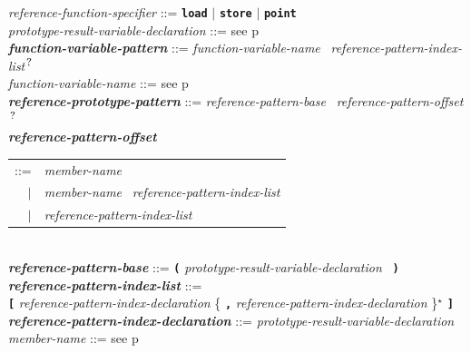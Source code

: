 \documentclass[12pt]{article}
\newcommand{\TT}[1]{{\tt \bfseries #1}}
\newcommand{\STAR}{{\Large $^\star$}}
\newcommand{\QMARK}{{$^{\,\mbox{\footnotesize ?}}$}}
\newcommand{\ttkey}[1]{{\tt \bfseries #1}}
\newcommand{\emkey}[1]{{\em \bfseries #1}}
\newcommand{\pagref}[1]{p\pageref{#1}}
\newenvironment{indpar}[1][0.3in]%
	{\begin{list}{}%
		     {\setlength{\itemsep}{0in}%
		      \setlength{\topsep}{0in}%
		      \setlength{\parsep}{1ex}%
		      \setlength{\labelwidth}{#1}%
		      \setlength{\leftmargin}{#1}%
		      \addtolength{\leftmargin}{\labelsep}}%
	 \item}%
	{\end{list}}
\begin{document}
\begin{indpar}[0.1in]
{\em reference-function-specifier} ::=
    \ttkey{load} $|$ \ttkey{store} $|$ \ttkey{point}
\\[0.5ex]
{\em prototype-result-variable-declaration} ::=
    see \pagref{PROTOTYPE-RESULT-VARIABLE-DECLARATION}
\\[0.5ex]
\emkey{function-variable-pattern}\label{FUNCTION-VARIABLE-PATTERN}
    ::= {\em function-variable-name}~ {\em reference-pattern-index-list}\QMARK{}
\\[0.5ex]
{\em function-variable-name} ::= see \pagref{FUNCTION-VARIABLE-NAME}
\\[0.5ex]
\emkey{reference-prototype-pattern}\label{REFERENCE-PROTOTYPE-PATTERN}
    ::= {\em reference-pattern-base}~ {\em reference-pattern-offset}\QMARK{}
\\[0.5ex]
\emkey{reference-pattern-offset}\label{REFERENCE-PATTERN-OFFSET}
    \begin{tabular}[t]{rl}
    ::= & {\em member-name} \\
    $|$ & {\em member-name}~ {\em reference-pattern-index-list} \\
    $|$ & {\em reference-pattern-index-list} \\
    \end{tabular}
\\[0.5ex]
\emkey{reference-pattern-base} ::=
    \TT{(} {\em prototype-result-variable-declaration}~ \TT{)}
\\[0.5ex]
\emkey{reference-pattern-index-list} ::= \\
\hspace*{0.5in}
    \TT{[} {\em reference-pattern-index-declaration}
           \{ \TT{,} {\em reference-pattern-index-declaration} \}\STAR{} \TT{]}
\\[0.5ex]
\emkey{reference-pattern-index-declaration} ::=
    {\em prototype-result-variable-declaration}
\\[0.5ex]
{\em member-name} ::= see \pagref{MEMBER-NAME}
\end{indpar}
\end{document}
